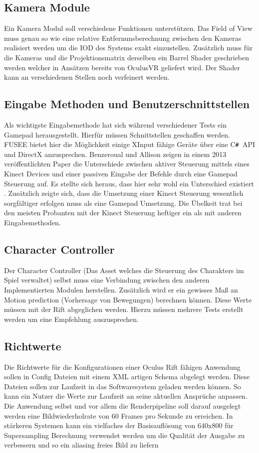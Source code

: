 \documentclass[pagesize, paper=a4, fontsize=12pt,titlepage=true, headings=small, headnosepline, abstractoff, liststotoc, nochapterprefix, plainheadsepline, twoside]{scrreprt}
\newcommand{\CSS}{C\texttt{\# }}
\begin{document}
\subsection{Kamera Module}
Ein Kamera Modul soll verschiedene Funktionen unterstützen. Das Field of View muss genau  so wie eine relative Entfernunsberechnung zwischen den Kameras realisiert werden um die IOD des Systems exakt einzustellen. Zusätzlich muss für die Kameras und die Projektionsmatrix derselben ein Barrel Shader geschrieben werden welcher in Ansätzen bereits von OculusVR geliefert wird. Der Shader kann an verschiedenen Stellen noch verfeinert werden.

\subsection{Eingabe Methoden und Benutzerschnittstellen}
Als wichtigste Eingabemethode hat sich während verschiedener Tests ein Gamepad herausgestellt. Hierfür müssen Schnittstellen geschaffen werden. FUSEE bietet hier die Möglichkeit einige XInput fähige Geräte über eine \CSS API und DirectX anzusprechen. Benzeroual und Allison zeigen in einem 2013 veröffentlichten Paper die Unterschiede zwischen aktiver Steuerung mittels eines Kinect Devices und einer passiven Eingabe der Befehle durch eine Gamepad Steuerung auf. Es stellte sich heraus, dass  hier sehr wohl ein Unterschied existiert \cite{BenzAllison2013}. Zusätzlich zeigte sich, dass die Umsetzung einer Kinect Steuerung wesentlich sorgfältiger erfolgen muss als eine Gamepad Umsetzung. Die Übelkeit trat bei den meisten Probanten mit der Kinect Steuerung heftiger ein als mit anderen Eingabemethoden.

\subsection{Character Controller}
Der Character Controller (Das Asset welches die Steuerung des Charakters im Spiel verwaltet) selbst muss eine Verbindung zwischen den anderen Implementierten Modulen herstellen. Zusätzlich wird er ein gewisses Maß an Motion prediction (Vorhersage von Bewegungen) berechnen können. Diese Werte müssen mit der Rift abgeglichen werden. Hierzu müssen mehrere Tests erstellt werden um eine Empfehlung auszusprechen.

\subsection{Richtwerte}
Die Richtwerte für die Konfigurationen einer Oculus Rift fähigen Anwendung sollen in Config Dateien mit einem XML artigen Schema abgelegt werden. Diese Dateien sollen zur Laufzeit in das Softwaresystem geladen werden können. So kann ein Nutzer die Werte zur Laufzeit an seine aktuellen Ansprüche anpassen. Die Anwendung selbst und vor allem die Renderpipeline soll darauf ausgelegt werden eine Bildwiederholrate von 60 Frames pro Sekunde zu erreichen. In stärkeren Systemen kann ein vielfaches der Basisauflösung von 640x800 für Supersampling Berechnung verwendet werden um die Qualität der Ausgabe zu verbessern und so ein aliasing freies Bild zu liefern
\end{document}
